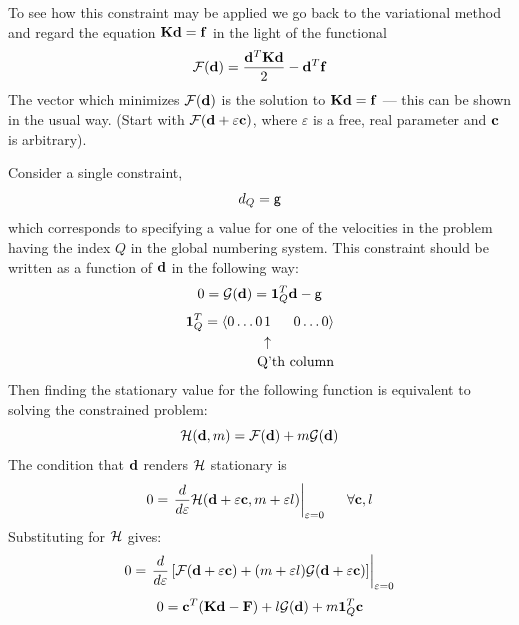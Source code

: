 \documentclass[10pt]{article}
\newcommand{\curly}{\sf }
\begin{document}
To see how this constraint may be applied we go back to the variational method and 
regard the equation ${\bf Kd = f}$ in the light of the functional
	\begin{equation}
		{\cal F} ({\bf d}) = \frac{{\bf d}^T{\bf Kd}}{2} - {\bf d}^T {\bf f}
	\end{equation}
The vector which minimizes ${\cal F} ({\bf d})$ is the solution to ${\bf Kd = f}$ --- this
can be shown in the usual way. (Start with $ {\cal F}({\bf d + \varepsilon c}) $, where
$\varepsilon$ is a free, real parameter and $\bf c$ is arbitrary).

Consider a single constraint,
	\begin{equation}
		d_Q = \mbox{\curly g}
	\end{equation} 
which corresponds to specifying a value for one of the velocities in the problem having the index $Q$ in the global
numbering system. This constraint should be written as a function of $\bf d$  in the following way:
	\begin{equation}
		0 = {\cal G}({\bf d}) = {\bf 1}_Q^T{\bf d} -\mbox{\curly g}
	\end{equation}
	\begin{eqnarray}
		{\bf 1}^T_Q = \left\langle 0 \ldots 0  \right. & 1 & \left. 0 \ldots 0 \right\rangle \\
		 & \raisebox{5mm}{$\uparrow$} & \!\!\!\!\!\!\!\!\!\!\!\!\!\! \mbox{  Q'th column} \nonumber
	\end{eqnarray}
Then finding the stationary value for the following function is equivalent to solving the constrained problem:
	\begin{equation}
	{\cal H}({\bf d},m) = {\cal F}({\bf d}) + m{\cal G}({\bf d})
	\end{equation}
The condition that $\bf d$ renders $\cal H$ stationary is 
	\begin{equation}
	0 = \left. \frac{d}{d\varepsilon} {\cal H}({\bf d}+\varepsilon{\bf c},m + \varepsilon l) \right|_{\varepsilon=0}
	\hspace{5mm} \forall {\bf c},l
	\end{equation}
Substituting for $\cal H$ gives:
	\begin{equation}
		0 = \left. \frac{d}{d\varepsilon} \left[ {\cal F}({\bf d}+\varepsilon{\bf c} )+
			 (m+\varepsilon l){\cal G}({\bf d}+\varepsilon{\bf c} )\right] \right|_{\varepsilon=0}
	\end{equation}
	\begin{equation}
		0= {\bf c}^T({\bf Kd -F) }+l {\cal G}({\bf d}) + m{\bf 1}_Q^T {\bf c}
	\end{equation}
\end{document}
